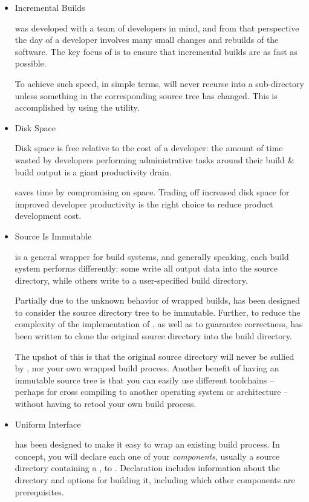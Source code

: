 \begin{itemize}
\item Incremental Builds

  \lmsbw was developed with a team of developers in mind, and from that
  perspective the day of a developer involves many small changes and
  rebuilds of the software.  The key focus of \lmsbw is to ensure that
  incremental builds are as fast as possible.

  To achieve such speed, in simple terms, \lmsbw will never recurse
  into a sub-directory unless something in the corresponding source
  tree has changed.  This is accomplished by using the \mtree utility.

\item Disk Space

  Disk space is free relative to the cost of a developer: the amount
  of time wasted by developers performing administrative tasks around
  their build \& build output is a giant productivity drain.

  \lmsbw saves time by compromising on space.  Trading off increased
  disk space for improved developer productivity is the right choice
  to reduce product development cost.

\item Source Is Immutable

  \lmsbw is a general wrapper for build systems, and generally
  speaking, each build system performs differently: some write all
  output data into the source directory, while others write to a
  user-specified build directory.

  Partially due to the unknown behavior of wrapped builds, \lmsbw has
  been designed to consider the source directory tree to be immutable.
  Further, to reduce the complexity of the implementation of \lmsbw,
  as well as to guarantee correctness, \lmsbw has been written to
  clone the original source directory into the build directory.

  The upshot of this is that the original source directory will never
  be sullied by \lmsbw, nor your own wrapped build process.  Another
  benefit of having an immutable source tree is that you can easily
  use different toolchains -- perhaps for cross compiling to another
  operating system or architecture -- without having to retool your
  own build process.

\item Uniform Interface

  \lmsbw has been designed to make it easy to wrap an existing build
  process.  In concept, you will declare each one of your
  \emph{components}, usually a source directory containing a
  \makefile, to \lmsbw.  Declaration includes information about the
  directory and options for building it, including which other
  components are prerequisites.


\end{itemize}
